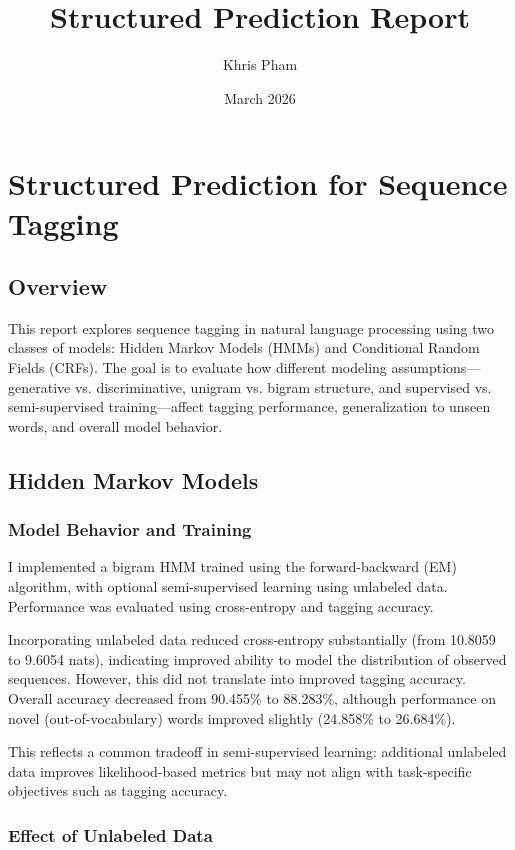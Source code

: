 \documentclass{article}
\title{Structured Prediction Report}
\author{Khris Pham}
\date{March 2026}
\begin{document}
\maketitle

\section{Structured Prediction for Sequence Tagging}

\subsection{Overview}

This report explores sequence tagging in natural language processing using two classes of models: Hidden Markov Models (HMMs) and Conditional Random Fields (CRFs). The goal is to evaluate how different modeling assumptions—generative vs. discriminative, unigram vs. bigram structure, and supervised vs. semi-supervised training—affect tagging performance, generalization to unseen words, and overall model behavior.

\subsection{Hidden Markov Models}

\subsubsection{Model Behavior and Training}

I implemented a bigram HMM trained using the forward-backward (EM) algorithm, with optional semi-supervised learning using unlabeled data. Performance was evaluated using cross-entropy and tagging accuracy.

Incorporating unlabeled data reduced cross-entropy substantially (from 10.8059 to 9.6054 nats), indicating improved ability to model the distribution of observed sequences. However, this did not translate into improved tagging accuracy. Overall accuracy decreased from 90.455\% to 88.283\%, although performance on novel (out-of-vocabulary) words improved slightly (24.858\% to 26.684\%).

This reflects a common tradeoff in semi-supervised learning: additional unlabeled data improves likelihood-based metrics but may not align with task-specific objectives such as tagging accuracy.

\subsubsection{Effect of Unlabeled Data}
\end{document}
